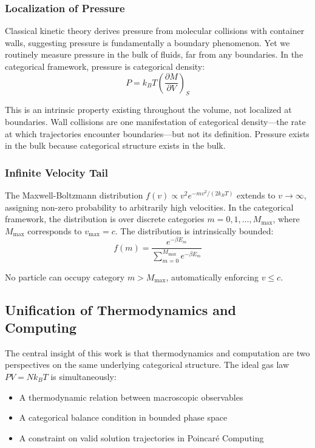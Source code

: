 \subsubsection{Localization of Pressure}

Classical kinetic theory derives pressure from molecular collisions with container walls, suggesting pressure is fundamentally a boundary phenomenon. Yet we routinely measure pressure in the bulk of fluids, far from any boundaries. In the categorical framework, pressure is categorical density:
\begin{equation}
P = k_B T \left(\frac{\partial M}{\partial V}\right)_S
\end{equation}

This is an intrinsic property existing throughout the volume, not localized at boundaries. Wall collisions are one manifestation of categorical density---the rate at which trajectories encounter boundaries---but not its definition. Pressure exists in the bulk because categorical structure exists in the bulk.

\subsubsection{Infinite Velocity Tail}

The Maxwell-Boltzmann distribution $f(v) \propto v^2 e^{-mv^2/(2k_BT)}$ extends to $v \to \infty$, assigning non-zero probability to arbitrarily high velocities. In the categorical framework, the distribution is over discrete categories $m = 0, 1, \ldots, M_{\max}$, where $M_{\max}$ corresponds to $v_{\max} = c$. The distribution is intrinsically bounded:
\begin{equation}
f(m) = \frac{e^{-\beta E_m}}{\sum_{m=0}^{M_{\max}} e^{-\beta E_m}}
\end{equation}

No particle can occupy category $m > M_{\max}$, automatically enforcing $v \leq c$.

\subsection{Unification of Thermodynamics and Computing}

The central insight of this work is that thermodynamics and computation are two perspectives on the same underlying categorical structure. The ideal gas law $PV = Nk_BT$ is simultaneously:
\begin{itemize}
    \item A thermodynamic relation between macroscopic observables
    \item A categorical balance condition in bounded phase space
    \item A constraint on valid solution trajectories in Poincar\'e Computing
\end{itemize}

